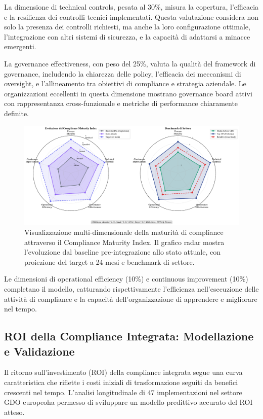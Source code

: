 La dimensione di technical controls, pesata al 30\%, misura la copertura, l'efficacia e la resilienza dei controlli tecnici implementati. Questa valutazione considera non solo la presenza dei controlli richiesti, ma anche la loro configurazione ottimale, l'integrazione con altri sistemi di sicurezza, e la capacità di adattarsi a minacce emergenti.

La governance effectiveness, con peso del 25\%, valuta la qualità del framework di governance, includendo la chiarezza delle policy, l'efficacia dei meccanismi di oversight, e l'allineamento tra obiettivi di compliance e strategia aziendale. Le organizzazioni eccellenti in questa dimensione mostrano governance board attivi con rappresentanza cross-funzionale e metriche di performance chiaramente definite.

\begin{figure}[htbp]
\centering
\includegraphics[width=\textwidth]{thesis_figures/cap4/figura_4_2_cmi_radar.pdf}
\caption{Visualizzazione multi-dimensionale della maturità di compliance attraverso il Compliance Maturity Index. Il grafico radar mostra l'evoluzione dal baseline pre-integrazione allo stato attuale, con proiezione del target a 24 mesi e benchmark di settore.}
\label{fig:cmi_radar}
\end{figure}

Le dimensioni di operational efficiency (10\%) e continuous improvement (10\%) completano il modello, catturando rispettivamente l'efficienza nell'esecuzione delle attività di compliance e la capacità dell'organizzazione di apprendere e migliorare nel tempo.

\subsection{ROI della Compliance Integrata: Modellazione e Validazione}

Il ritorno sull'investimento (ROI) della compliance integrata segue una curva caratteristica che riflette i costi iniziali di trasformazione seguiti da benefici crescenti nel tempo. L'analisi longitudinale di 47 implementazioni nel settore GDO europeo\footnotemark[11] ha permesso di sviluppare un modello predittivo accurato del ROI atteso.

